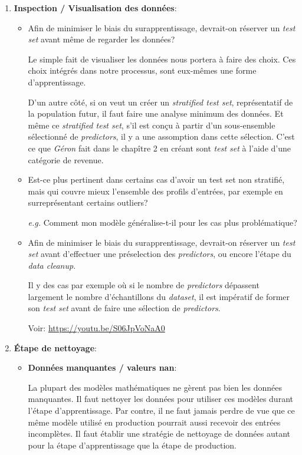 \documentclass{article}
\begin{document}
\begin{enumerate}
\item  \textbf{Inspection / Visualisation des données}:
  \begin{itemize}[itemsep=1em]
  \item Afin de minimiser le biais du surapprentissage, devrait-on réserver un \emph{test set}
    avant même de regarder les données?
    
    Le simple fait de visualiser les données nous portera à faire des choix.
    Ces choix intégrés dans notre processus, sont eux-mêmes une forme
    d'apprentissage.
    
    D'un autre côté,  si on veut un créer un \emph{stratified test set},
    représentatif de la population futur, il faut faire une analyse minimum
    des données. Et même ce \emph{stratified test set}, s'il est conçu à partir d'un
    sous-ensemble sélectionné de \emph{predictors}, il y a une assomption dans
    cette sélection. C'est ce que \emph{Géron} fait dans le chapître 2 en
    créant sont \emph{test set} à l'aide d'une catégorie de revenue.

  \item Est-ce plus pertinent dans certains cas d'avoir un test set non
    stratifié, mais qui couvre mieux l'ensemble des profils d'entrées, par
    exemple en surreprésentant certains outliers?

    \emph{e.g.} Comment mon modèle généralise-t-il pour les cas plus problématique?

  \item Afin de minimiser le biais du surapprentissage, devrait-on réserver un \emph{test set}
    avant d'effectuer une préselection des \emph{predictors}, ou encore
    l'étape du \emph{data cleanup}.

    Il y des cas par exemple où si le nombre de \emph{predictors} dépassent
    largement le nombre d'échantillons du \emph{dataset}, il est impératif
    de former son \emph{test set} avant de faire une sélection de \emph{predictors}.

    Voir: \url{https://youtu.be/S06JpVoNaA0}
  \end{itemize}
\item \textbf{Étape de nettoyage}:
  \begin{itemize}[itemsep=1em]
  \item \textbf{Donn\'ees manquantes / valeurs nan}:

    La plupart des modèles mathématiques ne gèrent pas bien les donn\'ees
    manquantes. Il faut nettoyer les données pour utiliser ces modèles
    durant l'étape d'apprentissage. Par contre, il ne faut jamais perdre de
    vue que ce même modèle utilisé en production pourrait aussi recevoir
    des entrées incomplètes. Il faut établir une stratégie de nettoyage de
    données autant pour la étape d'apprentissage que la étape de
    production.


\end{itemize}
\end{enumerate}
\end{document}
